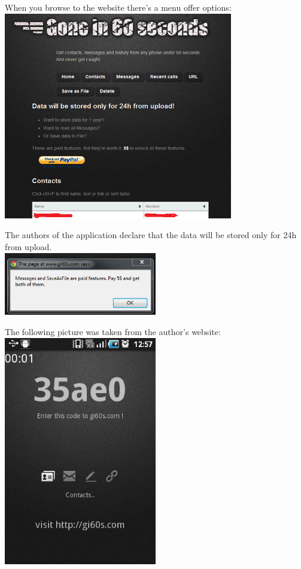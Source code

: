 \parbox{\textwidth}{
When you browse to the website there's a menu offer options: \\
\includegraphics[width=0.75\textwidth]{figs/gone60_13.png}
}

\parbox{\textwidth}{
The authors of the application declare that the data will be stored only for 24h from upload. \\
\includegraphics[width=0.5\textwidth]{figs/gone60_14.png}
}

\parbox{\textwidth}{
The following picture was taken from the author's website:\\
\includegraphics[width=0.5\textwidth]{figs/gone60_15.png}
}
